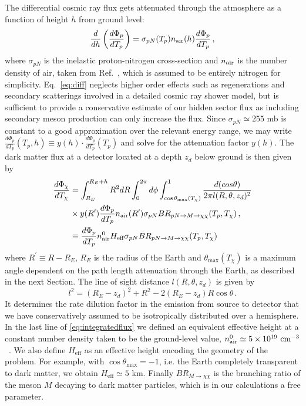 \documentclass[prl,twocolumn,groupedaddress,nofootinbib, superscriptaddress]{revtex4-1}
\begin{document}
The differential cosmic ray flux gets attenuated through the atmosphere as a function of height $h$ from ground level: 
%
\begin{equation}
\frac{d}{dh}\left(\frac{d\Phi_p}{dT_p}\right) = \sigma_{pN}(T_p) n_{\rm air}(h) \frac{d\Phi_p}{dT_p} \, ,
\label{eq:diff}
\end{equation}
%
where $\sigma_{pN}$ is the inelastic proton-nitrogen cross-section and $n_{\rm air}$ is the number density of air, taken from Ref.~\cite{Jursa:1985}, which is assumed to be entirely nitrogen for simplicity. Eq.~\ref{eq:diff} neglects higher order effects such as regenerations and secondary scatterings involved in a detailed cosmic ray shower model, but is sufficient to provide a conservative estimate of our hidden sector flux as including secondary meson production can only increase the flux. Since $\sigma_{pN} \simeq 255$ mb is constant to a good approximation over the relevant energy range, we may write $\frac{d\Phi_p}{dT_p}(T_p,h) \equiv y(h) \cdot \frac{d\Phi_p}{dT_p}(T_p)$ and solve for the attenuation factor $y(h)$. The dark matter flux at a detector located at a depth $z_d$ below ground is then given by
%
\begin{align}
\frac{d\Phi_\chi}{dT_\chi} &= \int_{R_E}^{R_E+h} R^2 dR \int_0^{2\pi}d\phi \int_{\cos\theta_\text{max}(T_\chi)}^1 \frac{d(cos{\theta})}{2\pi l(R,\theta, z_d)^2} \nonumber \\
& \times y(R^\prime) \frac{d\Phi_p}{dT_p}  n_{\rm air}(R^\prime) \sigma_{pN} BR_{pN \to M \to \chi\chi}(T_p, T_\chi) \, , \nonumber \\
& \equiv \frac{d\Phi_p}{dT_p} n_{\rm air}^0 H_\text{eff} \sigma_{pN} BR_{pN \to M \to \chi\chi}(T_p, T_\chi)
\label{eq:integratedflux}
\end{align}
%
where $R^\prime \equiv R-R_E$, $R_E$ is the radius of the Earth and $\theta_\text{max}(T_\chi)$ is a maximum angle dependent on the path length attenuation through the Earth, as described in the next Section. The line of sight distance $l(R,\theta, z_d)$ is given by 
%
\begin{equation}
l^2 = (R_E - z_d)^2 + R^2 - 2(R_E - z_d)R \cos{\theta} \, .
\end{equation}
%
It determines the rate dilution factor in the emission from source to detector that we have conservatively assumed to be isotropically distributed over a hemisphere. In the last line of \cref{eq:integratedflux} we defined an equivalent effective height at a constant number density taken to be the ground-level value, $n_{\rm air}^0 \simeq 5\times 10^{19} \text{ cm}^{-3}$~\cite{Jursa:1985}. We also define $H_\text{eff}$ as an effective height encoding the geometry of the problem. For example, with $\cos\theta_\text{max} = -1$, i.e. the Earth completely transparent to dark matter, we obtain $H_\text{eff} \simeq 5$ km. Finally $BR_{M \to \chi\chi}$ is the branching ratio of the meson $M$ decaying to dark matter particles, which is in our calculations a free parameter.
\end{document}
